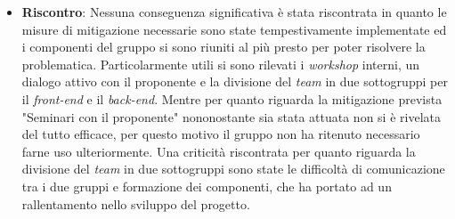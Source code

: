 \begin{itemize}
	\item \textbf{Riscontro}: Nessuna conseguenza significativa è stata riscontrata in quanto le misure di mitigazione necessarie sono state tempestivamente implementate
	ed i componenti del gruppo si sono riuniti al più presto per poter risolvere la problematica. Particolarmente utili si sono rilevati i \textit{workshop} interni,
	un dialogo attivo con il proponente e la divisione del \textit{team} in due sottogruppi per il \textit{front-end} e il \textit{back-end}. Mentre per quanto riguarda la mitigazione 
	prevista "Seminari con il proponente" nononostante sia stata attuata non si è rivelata del tutto efficace, per questo motivo il gruppo non ha ritenuto necessario farne uso ulteriormente.
	Una criticità riscontrata per quanto riguarda la divisione del \textit{team} in due sottogruppi sono state le difficoltà di comunicazione tra i due gruppi e formazione dei componenti, 
	che ha portato ad un rallentamento nello sviluppo del progetto.
\end{itemize}
